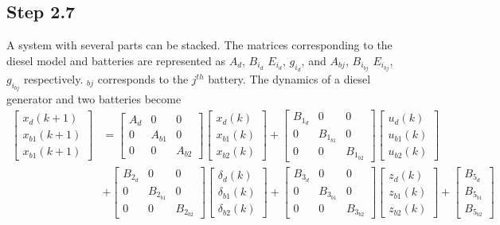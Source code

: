 \subsection*{Step 2.7}
A system with several parts can be stacked. The matrices corresponding to the diesel model and batteries are represented as $A_{d}$, $B_{i_{d}}$ $E_{i_{d}}$, $g_{i_{d}}$, and $A_{bj}$, $B_{i_{bj}}$ $E_{i_{bj}}$, $g_{i_{bj}}$ respectively. $_{bj}$ corresponds to the $j^{th}$ battery. The dynamics of a diesel generator and two batteries become
\begin{align*}
    \begin{bmatrix} x_d(k+1)\\ x_{b1}(k+1)\\x_{b1}(k+1)\end{bmatrix} &= \begin{bmatrix} A_d & 0 & 0\\ 0 & A_{b1} & 0\\ 0 & 0 & A_{b2}\end{bmatrix}\begin{bmatrix} x_d(k)\\ x_{b1}(k)\\x_{b2}(k)\end{bmatrix}
    + \begin{bmatrix} B_{1_{d}} & 0 & 0\\ 0 & B_{1_{b1}} & 0\\ 0 & 0 & B_{1_{b2}}\end{bmatrix}\begin{bmatrix} u_d(k)\\ u_{b1}(k)\\u_{b2}(k)\end{bmatrix} \\
    &+ \begin{bmatrix} B_{2_{d}} & 0 & 0\\ 0 & B_{2_{b1}} & 0\\ 0 & 0 & B_{2_{b2}}\end{bmatrix}\begin{bmatrix} \delta_d(k)\\ \delta_{b1}(k)\\\delta_{b2}(k)\end{bmatrix}
    + \begin{bmatrix} B_{3_{d}} & 0 & 0\\ 0 & B_{3_{b1}} & 0\\ 0 & 0 & B_{3_{b2}}\end{bmatrix}\begin{bmatrix} z_d(k)\\ z_{b1}(k)\\z_{b2}(k)\end{bmatrix} 
    + \begin{bmatrix} B_{5_{d}}\\ B_{5_{b1}}\\B_{5_{b2}}\end{bmatrix}
\end{align*}
